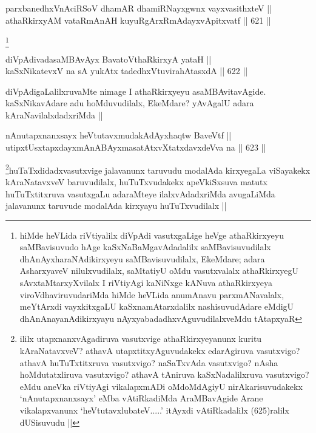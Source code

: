 \begin{shl}
parxbanedhxVnAciRSoV dhamAR dhamiRNayxgwnx vayxvasithxteV || \\
athaRkirxyAM vataRmAnAH kuyuRgArxRmAdayxvApitxvatf ||  621 ||  
\end{shl}

\begin{artha}
\footnote{hiMde heVLida riVtiyalilx diVpAdi vasutxgaLige heVge athaRkirxyeyu saMBavisuvudo hAge kaSxNaBaMgavAdadalilx saMBavisuvudilalx dhAnAyxharaNAdikirxyeyu saMBavisuvudilalx, EkeMdare; adara AsharxyaveV nilulxvudilalx, saMtatiyU oMdu vasutxvalalx athaRkirxyegU sAvxtaMtarxyXvilalx I riVtiyAgi kaNiNxge kANuva athaRkirxyeya viroVdhaviruvudariMda hiMde heVLida anumAnavu parxmANavalalx, meYtArxdi vayxkitxgaLU kaSxnamAtarxdalilx nashisuvudAdare eMdigU dhAnAnayanAdikirxyayu nAyxyabadadhxvAguvudilalxveMdu tAtapxyaR}
\end{artha}

\begin{shl}
diVpAdivadasaMBAvAyx BavatoV\s thaRkirxyA yataH || \\
kaSxNikatevxV na sA yukAtx tadedhxVtuvirahAtasxdA ||  622 ||  
\end{shl}

\begin{artha}
diVpAdigaLalilxruvaMte nimage I athaRkirxyeyu asaMBAvitavAgide. kaSxNikavAdare adu hoMduvudilalx, EkeMdare? yAvAgalU adara kAraNavilalxdadxriMda ||
\end{artha}


\begin{shl}
nAnutapxnanxsayx heVtutavxmudakAdAyxhaqtw BaveVtf || \\
utipxtUsxtapxdayxmAnABAyxmasatAtxvXtatxdavxdeVva na ||  623 ||  
\end{shl}

\begin{artha}
\footnote{ililx utapxnanxvAgadiruva vasutxvige athaRkirxyeyanunx kuritu kAraNatavxveV? athavA utapxtitxyAguvudakekx edarAgiruva vasutxvigo? athavA huTuTxtitxruva vasutxvigo? naSaTxvAda vasutxvigo? nAsha hoMdutatxliruva vasutxvigo? athavA tAniruva kaSxNadalilxruva vasutxvigo? eMdu aneVka riVtiyAgi vikalapxmADi oMdoMdAgiyU nirAkarisuvudakekx `nAnutapxnanxsayx' eMba vAtiRkadiMda AraMBavAgide Arane vikalapxvanunx `heVtutavxlubateV.....' itAyxdi vAtiRkadalilx (625)ralilx dUSisuvudu ||}huTaTxdidadxvasutxvige jalavanunx taruvudu modalAda kirxyegaLa viSayakekx kAraNatavxveV baruvudilalx, huTuTxvudakekx apeVkiSxsuva matutx huTuTxtitxruva vasutxgaLu adaraMteye ilalxvAdadxriMda avugaLiMda jalavanunx taruvude modalAda kirxyayu huTuTxvudilalx ||
\end{artha}

